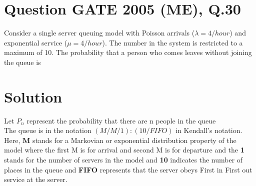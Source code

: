 \documentclass[journal,12pt,twocolumn]{IEEEtran}
\begin{document}
\section*{Question GATE 2005 (ME), Q.30}
Consider a single server queuing model with Poisson arrivals ($\lambda = 4/hour$) and exponential service ($\mu = 4/hour$). The number in the system is restricted to a maximum of 10. The probability that a person who comes leaves without joining the queue is 
\section*{Solution}
Let $P_{n}$ represent the probability that there are n people in the queue\\
The queue is in the notation $(M/M/1):(10/FIFO)$ in Kendall's notation.\\
Here, \textbf{M} stands for a Markovian or exponential distribution property of the model where the first M is for arrival and second M is for departure and the \textbf{1} stands for the number of servers in the model and \textbf{10} indicates the number of places in the queue and \textbf{FIFO} represents that the server obeys First in First out service at the server.\\
\end{document}
